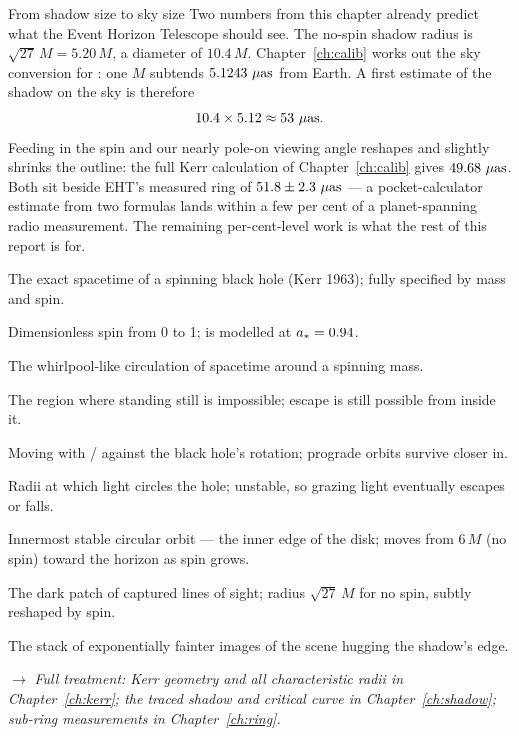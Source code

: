 \begin{worked}{From shadow size to sky size}
Two numbers from this chapter already predict what the Event Horizon
Telescope should see. The no-spin shadow radius is
$\sqrt{27}\,M = 5.20\,M$, a diameter of $10.4\,M$.
Chapter~\ref{ch:calib} works out the sky conversion for \sgra{}: one
$M$ subtends $5.1243~\mu\mathrm{as}$ from Earth. A first estimate of the
shadow on the sky is therefore
\[
10.4 \times 5.12 \approx 53~\mu\mathrm{as}.
\]
Feeding in the spin and our nearly pole-on viewing angle reshapes and
slightly shrinks the outline: the full Kerr calculation of
Chapter~\ref{ch:calib} gives $49.68~\mu\mathrm{as}$. Both sit beside EHT's
measured ring of $51.8\pm2.3~\mu\mathrm{as}$ — a pocket-calculator estimate from
two formulas lands within a few per cent of a planet-spanning radio
measurement. The remaining per-cent-level work is what the rest of this
report is for.
\end{worked}

\begin{termsbox}
\item[Kerr metric] The exact spacetime of a spinning black hole (Kerr
1963); fully specified by mass and spin.
\item[Spin parameter $\astar$] Dimensionless spin from 0 to 1; \sgra{}
is modelled at $a_* = 0.94$.
\item[Frame dragging] The whirlpool-like circulation of spacetime around
a spinning mass.
\item[Ergosphere] The region where standing still is impossible; escape
is still possible from inside it.
\item[Prograde / retrograde] Moving with / against the black hole's
rotation; prograde orbits survive closer in.
\item[Photon sphere / photon orbits] Radii at which light circles the
hole; unstable, so grazing light eventually escapes or falls.
\item[ISCO] Innermost stable circular orbit — the inner edge of the
disk; moves from $6\,M$ (no spin) toward the horizon as spin grows.
\item[Shadow] The dark patch of captured lines of sight; radius
$\sqrt{27}\,M$ for no spin, subtly reshaped by spin.
\item[Photon ring] The stack of exponentially fainter images of the
scene hugging the shadow's edge.
\end{termsbox}

\noindent$\rightarrow$ \emph{Full treatment: Kerr geometry and all
characteristic radii in Chapter~\ref{ch:kerr}; the traced shadow and
critical curve in Chapter~\ref{ch:shadow}; sub-ring measurements in
Chapter~\ref{ch:ring}.}
